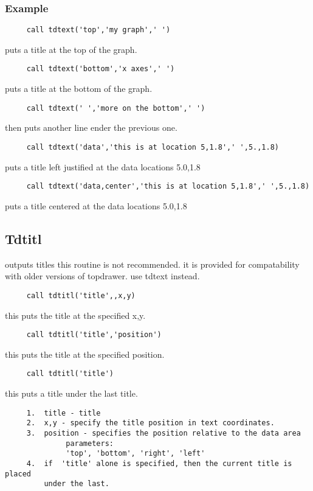 \subsubsection{Example}
\begin{verbatim}
     call tdtext('top','my graph',' ') 
\end{verbatim}
puts a title at the top of the graph.  
\begin{verbatim}
     call tdtext('bottom','x axes',' ') 
\end{verbatim}
puts a title at the bottom of the graph.  
\begin{verbatim}
     call tdtext(' ','more on the bottom',' ') 
\end{verbatim}
then puts another line ender the previous one.  
\begin{verbatim}
     call tdtext('data','this is at location 5,1.8',' ',5.,1.8) 
\end{verbatim}
puts a title left justified at the data locations 5.0,1.8 
\begin{verbatim}
     call tdtext('data,center','this is at location 5,1.8',' ',5.,1.8) 
\end{verbatim}
puts a title centered at the data locations 5.0,1.8 
\subsection{Tdtitl}
outputs titles 
this  routine  is not recommended.  it is provided for compatability with
older versions of topdrawer.  use tdtext instead.  
\begin{verbatim}
     call tdtitl('title',,x,y) 
\end{verbatim}
this puts the title at the specified x,y.  
\begin{verbatim}
     call tdtitl('title','position') 
\end{verbatim}
this puts the title at the specified position.  
\begin{verbatim}
     call tdtitl('title') 
\end{verbatim}
this puts a title under the last title.  

\begin{verbatim}
     1.  title - title 
     2.  x,y - specify the title position in text coordinates.  
     3.  position - specifies the position relative to the data area 
              parameters:  
              'top', 'bottom', 'right', 'left' 
     4.  if  'title' alone is specified, then the current title is placed
         under the last.  
\end{verbatim}
